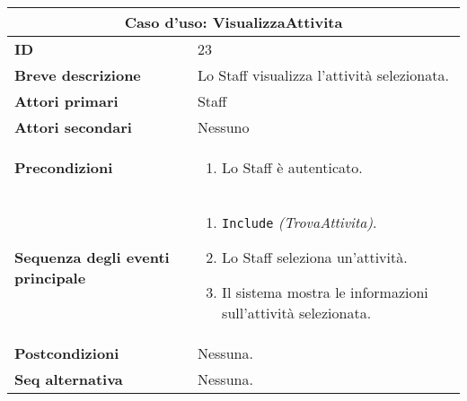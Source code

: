 \documentclass[a4paper]{report}
\begin{document}
\clearpage
\begin{table}[H]
\vspace*{-0cm}
\renewcommand{\arraystretch}{1.9}
\begin{tabular}{|p{3.9cm}|p{9.9cm}|}
\hline
\multicolumn{2}{|c|}{\textbf{Caso d’uso: VisualizzaAttivita}} \\ \hline
	\textbf{ID} & 23 \\ \hline
	\textbf{Breve descrizione} & Lo Staff visualizza l’attività selezionata. \\ \hline
	\textbf{Attori primari} & Staff \\ \hline
	\textbf{Attori secondari} & Nessuno \\ \hline
	\textbf{Precondizioni} & \begin{enumerate}[leftmargin=14pt,label=\arabic*.,labelsep=0.5em,topsep=0pt,partopsep=0pt,parsep=0pt,itemsep=0pt]
    \item Lo Staff è autenticato.
\end{enumerate} \\ \hline
	\textbf{Sequenza degli eventi principale} & \begin{enumerate}[leftmargin=14pt,label=\arabic*.,labelsep=0.5em,topsep=0pt,partopsep=0pt,parsep=0pt,itemsep=0pt]
    \item \texttt{Include} \textit{(TrovaAttivita)}.
    \item Lo Staff seleziona un’attività.
    \item Il sistema mostra le informazioni sull’attività selezionata.
\end{enumerate} \\ \hline
	\textbf{Postcondizioni} & Nessuna. \\ \hline
	\textbf{Seq alternativa} & Nessuna. \\ \hline
\end{tabular}
\end{table}
\end{document}
